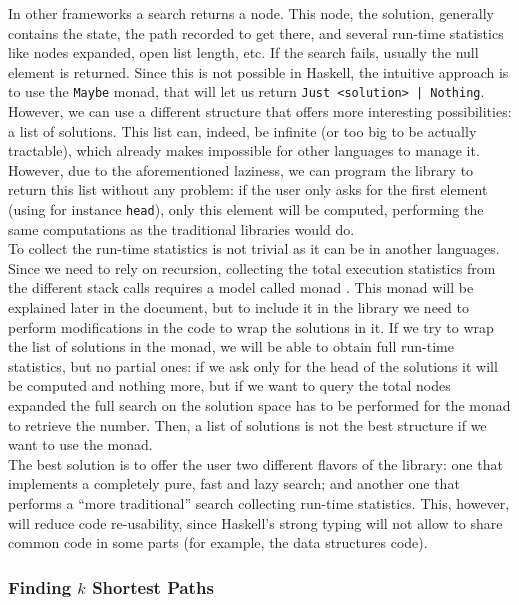 In other frameworks \cite{cpp-search, cs4j, java-aima, hog2} a search returns a
node. This node, the solution, generally contains the state, the path recorded
to get there, and several run-time statistics like nodes expanded, open list
length, etc. If the search fails, usually the null element is returned. Since
this is not possible in Haskell, the intuitive approach is to use the
\texttt{Maybe} monad, that will let us return \texttt{Just <solution> |
  Nothing}. However, we can use a different structure that offers more
interesting possibilities: a list of solutions. This list can, indeed, be
infinite (or too big to be actually tractable), which already makes impossible
for other languages to manage it. However, due to the aforementioned laziness,
we can program the library to return this list without any problem: if the user
only asks for the first element (using for instance \texttt{head}), only this
element will be computed, performing the same computations as the traditional
libraries would do.\\

To collect the run-time statistics is not trivial as it can be in another
languages. Since we need to rely on recursion, collecting the total execution
statistics from the different stack calls requires a model called monad
\cite{wadler-1993-monad}. This monad will be explained later in the document,
but to include it in the library we need to perform modifications in the code
to wrap the solutions in it. If we try to wrap the list of solutions in the
monad, we will be able to obtain full run-time statistics, but no partial ones:
if we ask only for the head of the solutions it will be computed and nothing
more, but if we want to query the total nodes expanded the full search on the
solution space has to be performed for the monad to retrieve the number. Then,
a list of solutions is not the best structure if we want to use the monad.\\

The best solution is to offer the user two different flavors of the library:
one that implements a completely pure, fast and lazy search; and another one
that performs a ``more traditional'' search collecting run-time statistics.
This, however, will reduce code re-usability, since Haskell's strong typing
will not allow to share common code in some parts (for example, the data
structures code).\\

\subsubsection{Finding $k$ Shortest Paths}

